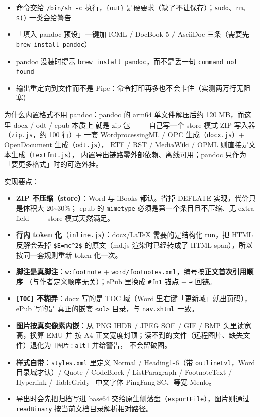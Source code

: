 \documentclass[11pt,a4paper]{ctexart}
\begin{document}
\begin{itemize}
\item 命令交给 \texttt{/bin/sh -c} 执行，\texttt{\{out\}} 是硬要求（缺了不让保存）；\texttt{sudo}、\texttt{rm}、\texttt{\$()} 一类会给警告
\item 「填入 pandoc 预设」一键加 ICML / DocBook 5 / AsciiDoc 三条（需要先 \texttt{brew install pandoc}）
\item pandoc 没装时提示 \texttt{brew install pandoc}，而不是丢一句 \texttt{command not found}
\item 输出重定向到文件而不是 Pipe：命令打印再多也不会卡住（实测两万行无阻塞）
\end{itemize}


为什么内置格式不用 pandoc：pandoc 的 arm64 单文件解压后约 120 MB，而这里 docx / odt / epub 本质上
就是 zip 包 —— 自己写一个 store 模式 ZIP 写入器（\texttt{zip.js}，约 100 行）+ 一套
WordprocessingML / OPC 生成（\texttt{docx.js}）+ OpenDocument 生成（\texttt{odt.js}），
RTF / RST / MediaWiki / OPML 则直接是文本生成（\texttt{textfmt.js}），
内置导出链路零外部依赖、离线可用；pandoc 只作为「要更多格式」时的可选外挂。

实现要点：

\begin{itemize}
\item \textbf{ZIP 不压缩（store）}：Word 与 iBooks 都认。省掉 DEFLATE 实现，代价只是体积大 20\textasciitilde{}30\%；
epub 的 \texttt{mimetype} 必须是第一个条目且不压缩、无 extra field —— store 模式天然满足。
\item \textbf{行内 token 化}（\texttt{inline.js}）：docx/LaTeX 需要的是结构化 run，把 HTML 反解会丢掉
\texttt{\$E=mc\textasciicircum{}2\$} 的原文（md.js 渲染时已经转成了 HTML span），所以按同一套规则重新 token 化一次。
\item \textbf{脚注是真脚注}：\texttt{w:footnote} + \texttt{word/footnotes.xml}，编号按\textbf{正文首次引用顺序}
（与作者定义顺序无关）；ePub 里换成 \texttt{\#fn1} 锚点 + \texttt{↩} 回链。
\item \textbf{\texttt{[TOC]} 不糊弄}：docx 写的是 TOC 域（Word 里右键「更新域」就出页码），ePub 写的是
真正的嵌套 \texttt{\textless{}ol\textgreater{}} 目录，与 \texttt{nav.xhtml} 一致。
\item \textbf{图片按真实像素内嵌}：从 PNG IHDR / JPEG SOF / GIF / BMP 头里读宽高，换算 EMU 并
按 A4 正文宽度封顶；读不到的文件（远程图片、缺失文件）退化为 \texttt{[图片：alt]} 并给警告，
不会留破图。
\item \textbf{样式自带}：\texttt{styles.xml} 里定义 Normal / Heading1-6（带 \texttt{outlineLvl}，Word 目录域才认）/
Quote / CodeBlock / ListParagraph / FootnoteText / Hyperlink / TableGrid，
中文字体 PingFang SC、等宽 Menlo。
\item 导出时会先把归档写进 base64 交给原生侧落盘（\texttt{exportFile}），图片则通过 \texttt{readBinary}
按当前文档目录解析相对路径。
\end{itemize}
\end{document}

